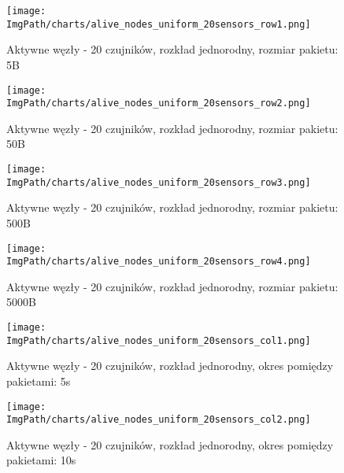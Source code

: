 \begin{figure}[!htbp]
	\begin{center}
		\texttt{[image: \\ImgPath/charts/alive\_nodes\_uniform\_20sensors\_row1.png]}
	\end{center}
	\caption{Aktywne węzły - 20 czujników, rozkład jednorodny, rozmiar pakietu: 5B}
\end{figure}

\begin{figure}[!htbp]
	\begin{center}
		\texttt{[image: \\ImgPath/charts/alive\_nodes\_uniform\_20sensors\_row2.png]}
	\end{center}
	\caption{Aktywne węzły - 20 czujników, rozkład jednorodny, rozmiar pakietu: 50B}
\end{figure}

\begin{figure}[!htbp]
	\begin{center}
		\texttt{[image: \\ImgPath/charts/alive\_nodes\_uniform\_20sensors\_row3.png]}
	\end{center}
	\caption{Aktywne węzły - 20 czujników, rozkład jednorodny, rozmiar pakietu: 500B}
\end{figure}

\begin{figure}[!htbp]
	\begin{center}
		\texttt{[image: \\ImgPath/charts/alive\_nodes\_uniform\_20sensors\_row4.png]}
	\end{center}
	\caption{Aktywne węzły - 20 czujników, rozkład jednorodny, rozmiar pakietu: 5000B}
\end{figure}

\begin{figure}[!htbp]
	\begin{center}
		\texttt{[image: \\ImgPath/charts/alive\_nodes\_uniform\_20sensors\_col1.png]}
	\end{center}
	\caption{Aktywne węzły - 20 czujników, rozkład jednorodny, okres pomiędzy pakietami: 5s}
\end{figure}

\begin{figure}[!htbp]
	\begin{center}
		\texttt{[image: \\ImgPath/charts/alive\_nodes\_uniform\_20sensors\_col2.png]}
	\end{center}
	\caption{Aktywne węzły - 20 czujników, rozkład jednorodny, okres pomiędzy pakietami: 10s}
\end{figure}

